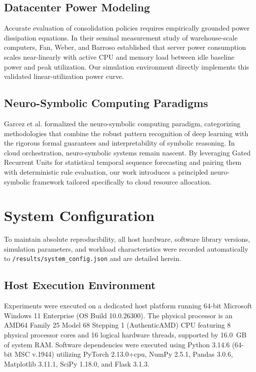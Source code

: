 \documentclass[conference]{IEEEtran}
\begin{document}
\subsection{Datacenter Power Modeling}
Accurate evaluation of consolidation policies requires empirically grounded power dissipation equations. In their seminal measurement study of warehouse-scale computers, Fan, Weber, and Barroso \cite{fan2007power} established that server power consumption scales near-linearly with active CPU and memory load between idle baseline power and peak utilization. Our simulation environment directly implements this validated linear-utilization power curve.

\subsection{Neuro-Symbolic Computing Paradigms}
Garcez et al. \cite{garcez2019neural} formalized the neuro-symbolic computing paradigm, categorizing methodologies that combine the robust pattern recognition of deep learning with the rigorous formal guarantees and interpretability of symbolic reasoning. In cloud orchestration, neuro-symbolic systems remain nascent. By leveraging Gated Recurrent Units \cite{cho2014learning} for statistical temporal sequence forecasting and pairing them with deterministic rule evaluation, our work introduces a principled neuro-symbolic framework tailored specifically to cloud resource allocation.

\section{System Configuration}
To maintain absolute reproducibility, all host hardware, software library versions, simulation parameters, and workload characteristics were recorded automatically to \texttt{/results/system\_config.json} and are detailed herein.

\subsection{Host Execution Environment}
Experiments were executed on a dedicated host platform running 64-bit Microsoft Windows 11 Enterprise (OS Build 10.0.26300). The physical processor is an AMD64 Family 25 Model 68 Stepping 1 (AuthenticAMD) CPU featuring 8 physical processor cores and 16 logical hardware threads, supported by 16.0~GB of system RAM. Software dependencies were executed using Python 3.14.6 (64-bit MSC v.1944) utilizing PyTorch 2.13.0+cpu, NumPy 2.5.1, Pandas 3.0.6, Matplotlib 3.11.1, SciPy 1.18.0, and Flask 3.1.3.
\end{document}
